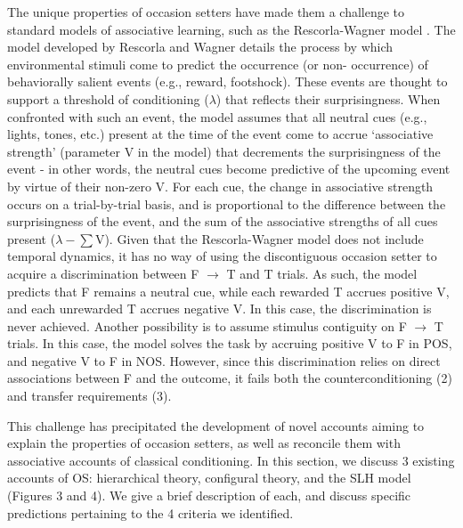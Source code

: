 \documentclass[11pt]{article}
\let\cite=\citep
\begin{document}
The unique properties of occasion setters have made them a challenge to 
standard models of associative learning, such as the Rescorla-Wagner model 
\cite{Rescorla1972}. The model developed by Rescorla and Wagner details the 
process by which environmental stimuli come to predict the occurrence (or non-
occurrence) of behaviorally salient events (e.g., reward, footshock). These 
events are thought to support a threshold of conditioning ($\lambda$) that 
reflects their surprisingness. When confronted with such an event, the model 
assumes that all neutral cues (e.g., lights, tones, etc.) present at the time 
of the event come to accrue `associative strength' (parameter V in the model) 
that decrements the surprisingness of the event - in other words, the neutral 
cues become predictive of the upcoming event by virtue of their non-zero V. For 
each cue, the change in associative strength occurs on a trial-by-trial basis, 
and is proportional to the difference between the surprisingness of the event, 
and the sum of the associative strengths of all cues present ($\lambda - \sum
$V). Given that the Rescorla-Wagner model does not include temporal dynamics, 
it has no way of using the discontiguous occasion setter to acquire a 
discrimination between F $\rightarrow$ T and T trials. As such, the model 
predicts that F remains a neutral cue, while each rewarded T accrues positive 
V, and each unrewarded T accrues negative V. In this case, the discrimination 
is never achieved. Another possibility is to assume stimulus contiguity on F $
\rightarrow$ T trials. In this case, the model solves the task by accruing 
positive V to F in POS, and negative V to F in NOS. However, since this 
discrimination relies on direct associations between F and the outcome, it 
fails both the counterconditioning (2) and transfer requirements (3).
	
This challenge has precipitated the development of novel accounts aiming to 
explain the properties of occasion setters, as well as reconcile them with 
associative accounts of classical conditioning. In this section, we discuss 3 
existing accounts of OS: hierarchical theory, configural theory, and the SLH 
model (Figures 3 and 4). We give a brief description of each, and discuss 
specific predictions pertaining to the 4 criteria we identified. 
\end{document}
